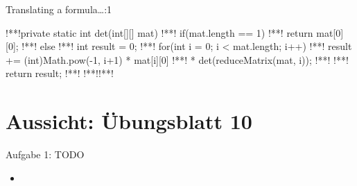 \begin{frame}[fragile,c]{Translating a formula\ldots{}:1}
\begin{plainjava}
!**!private static int det(int[][] mat) {
!**!    if(mat.length == 1) {
!**!        return mat[0][0];
!**!    } else {
!**!        int result = 0;
!**!        for(int i = 0; i < mat.length; i++) {
!**!            result += (int)Math.pow(-1, i+1) * mat[i][0]
!**!                * det(reduceMatrix(mat, i));
!**!        }
!**!        return result;
!**!    }
!**!}!**!
\end{plainjava}
\end{frame}


\iffull
{}
\section{Aussicht: Übungsblatt 10}

\begin{frame}{Aufgabe 1: TODO}
\begin{itemize}[<+(1)->]
    \item
\end{itemize}
\end{frame}


\iffull\fi
